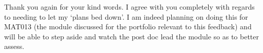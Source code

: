 \documentclass[a4paper,12pt]{article}
\begin{document}
Thank you again for your kind words. I agree with you completely with regards to needing to let my `plans bed down'. I am indeed planning on doing this for MAT013 (the module discussed for the portfolio relevant to this feedback) and will be able to step aside and watch the post doc lead the module so as to better assess.
\end{document}
